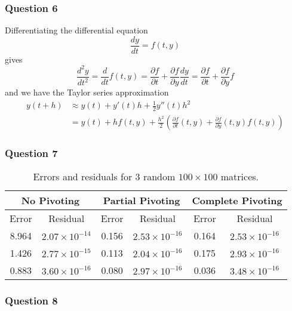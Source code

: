 \documentclass[11pt,a4paper]{article}
\begin{document}
\subsubsection*{Question 6}

Differentiating the differential equation
$$ \frac{dy}{dt} = f(t,y) $$
gives
$$ \frac{d^2y}{dt^2} = \frac{d}{dt} f(t,y) 
                  = \frac{\partial f}{\partial t}
                     + \frac{\partial f}{\partial y} \frac{dy}{dt} 
                  = \frac{\partial f}{\partial t}
                     + \frac{\partial f}{\partial y} f $$
and we have the Taylor series approximation
\begin{align*}
 y(t+h) &\approx y(t) + y'(t) h + \frac{1}{2} y''(t) h^2 \\
       &= y(t) + h f(t,y) + \frac{h^2}{2}
                   \left( \frac{\partial f}{\partial t}(t,y)
                     + \frac{\partial f}{\partial y}(t,y) f(t,y) \right) 
\end{align*}

\newpage

\subsubsection*{Question 7}

\begin{table}[!h]
  \begin{center}
  \begin{tabular}{|c|c|c|c|c|c|}
    \hline
     \multicolumn{2}{|c}{No Pivoting}
       & \multicolumn{2}{|c|}{Partial Pivoting}
       & \multicolumn{2}{c|}{Complete Pivoting} \\
    \hline
       Error & Residual & Error & Residual & Error & Residual\\
    \hline
      8.964 & $2.07 \times 10^{-14}$
      & 0.156 & $2.53 \times 10^{-16}$
      & 0.164 & $2.53 \times 10^{-16}$ \\
      1.426 & $2.77 \times 10^{-15}$
      & 0.113 & $2.04 \times 10^{-16}$
      & 0.175 & $2.93 \times 10^{-16}$ \\
      0.883 & $3.60 \times 10^{-16}$
      & 0.080 & $2.97 \times 10^{-16}$
      & 0.036 & $3.48 \times 10^{-16}$ \\
    \hline
  \end{tabular}
  \end{center}
  \caption{Errors and residuals for 3 random $100 \times 100$ matrices.}
\end{table}

\subsubsection*{Question 8}
\end{document}
